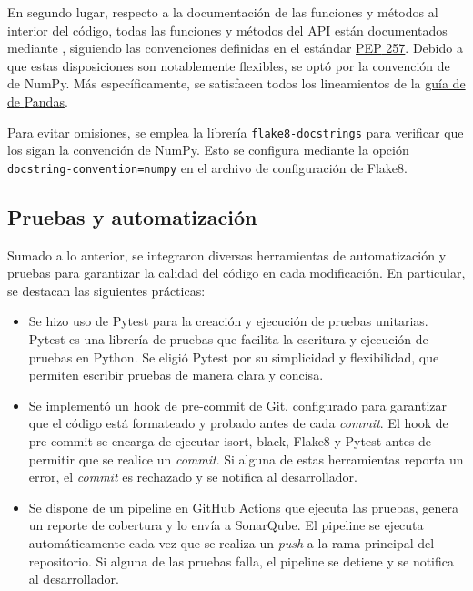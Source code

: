 En segundo lugar, respecto a la documentación de las funciones y métodos al interior del código, todas las funciones y métodos del \gls{API} están documentados mediante , siguiendo las convenciones definidas en el estándar \href{https://peps.python.org/pep-0257/}{\gls{PEP} 257}. Debido a que estas disposiciones son notablemente flexibles, se optó por la convención de  de \gls{NumPy}. Más específicamente, se satisfacen todos los lineamientos de la \href{https://python-sprints.github.io/pandas/guide/pandas_docstring.html}{guía de  de \gls{Pandas}}. 

Para evitar omisiones, se emplea la librería \verb|flake8-docstrings| para verificar que los  sigan la convención de \gls{NumPy}. Esto se configura mediante la opción \verb|docstring-convention=numpy| en el archivo de configuración de \gls{Flake8}.

\subsection{Pruebas y automatización}

Sumado a lo anterior, se integraron diversas herramientas de automatización y pruebas para garantizar la calidad del código en cada modificación. En particular, se destacan las siguientes prácticas:

\begin{itemize}
    \item Se hizo uso de \gls{Pytest} para la creación y ejecución de \gls{pruebas unitarias}. \gls{Pytest} es una librería de pruebas que facilita la escritura y ejecución de pruebas en \gls{Python}. Se eligió \gls{Pytest} por su simplicidad y flexibilidad, que permiten escribir pruebas de manera clara y concisa.
    \item Se implementó un \gls{hook} de pre-commit de \gls{Git}, configurado para garantizar que el código está formateado y probado antes de cada \textit{commit}. El \gls{hook} de pre-commit se encarga de ejecutar \gls{isort}, \gls{black}, \gls{Flake8} y \gls{Pytest} antes de permitir que se realice un \textit{commit}. Si alguna de estas herramientas reporta un error, el \textit{commit} es rechazado y se notifica al desarrollador.
    \item Se dispone de un \gls{pipeline} en \gls{GitHub Actions} que ejecuta las pruebas, genera un reporte de cobertura y lo envía a \gls{SonarQube}. El \gls{pipeline} se ejecuta automáticamente cada vez que se realiza un \textit{push} a la rama principal del repositorio. Si alguna de las pruebas falla, el \gls{pipeline} se detiene y se notifica al desarrollador.
\end{itemize}

